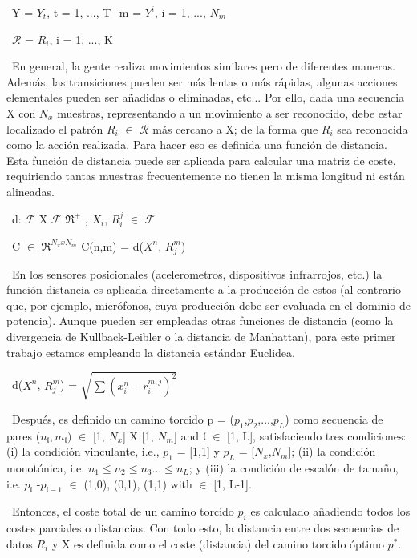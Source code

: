 \documentclass{paper}
\begin{document}
\ Y = {$Y_t$, t = 1, ..., T_m} = {$Y^i$, i = 1, ..., $N_m$}

\ $\mathcal{R}$ = {$R_i$, i = 1, ..., K}

\ En general, la gente realiza movimientos similares pero de diferentes maneras. Además, las transiciones pueden ser más lentas o más rápidas, algunas acciones elementales pueden ser añadidas o eliminadas, etc... Por ello, dada una secuencia X con $N_x$ muestras, representando a un movimiento a ser reconocido, debe estar localizado el patrón $R_i$ $\in$ $\mathcal{R}$ más cercano a X; de la forma que $R_i$ sea reconocida como la acción realizada. Para hacer eso es definida una función de distancia. Esta función de distancia puede ser aplicada para calcular una matriz de coste, requiriendo tantas muestras frecuentemente no tienen la misma longitud ni están alineadas.

\ d: $\mathcal{F}$ X $\mathcal{F}$  \longrightarrow $\mathfrak{R}^+$   ,    $X_i$, $R_i^j$ $\in$ $\mathcal{F}$

\ C $\in$ $\mathfrak{R}^{N_x x N_m}$  C(n,m) = d($X^n$, $R^m_j$)

\ En los sensores posicionales (acelerometros, dispositivos infrarrojos, etc.) la función distancia es aplicada directamente a la producción de estos (al contrario que, por ejemplo, micrófonos, cuya producción debe ser evaluada en el dominio de potencia). Aunque pueden ser empleadas otras funciones de distancia (como la divergencia de Kullback-Leibler o la distancia de Manhattan), para este primer trabajo estamos empleando la distancia estándar Euclidea.

\ d($X^n$, $R_j^m$) = $\sqrt{
\sum(x_i^n - r_i^{m,j})^2}$

\ Después, es definido un camino torcido  p = ($p_1$,$p_2$,...,$p_L$) como secuencia de pares ($n_\mathfrak{l}, m_\mathfrak{l})$ $\in$ [1, $N_x$] X [1, $N_m$] and $\mathfrak{l}$ $\in$ [1, L], satisfaciendo tres condiciones: (i) la condición vinculante, i.e., $p_1$ = [1,1] y $p_L$ = [$N_x$,$N_m$]; (ii) la condición monotónica, i.e. $n_1 \leq n_2  \leq n_3 ...  \leq n_L$; y (iii) la condición de escalón de tamaño, i.e. $p_\mathfrak{l}$ -$p_{\mathfrak{l}-1}$ $\in$ {(1,0), (0,1), (1,1)} with  $\in$ [1, L-1].

\ Entonces, el coste total de un camino torcido $p_i$ es calculado añadiendo todos los costes parciales o distancias. Con todo esto, la distancia entre dos secuencias de datos $R_i$ y X es definida como el coste (distancia) del camino torcido óptimo $p^*$.
\end{document}
